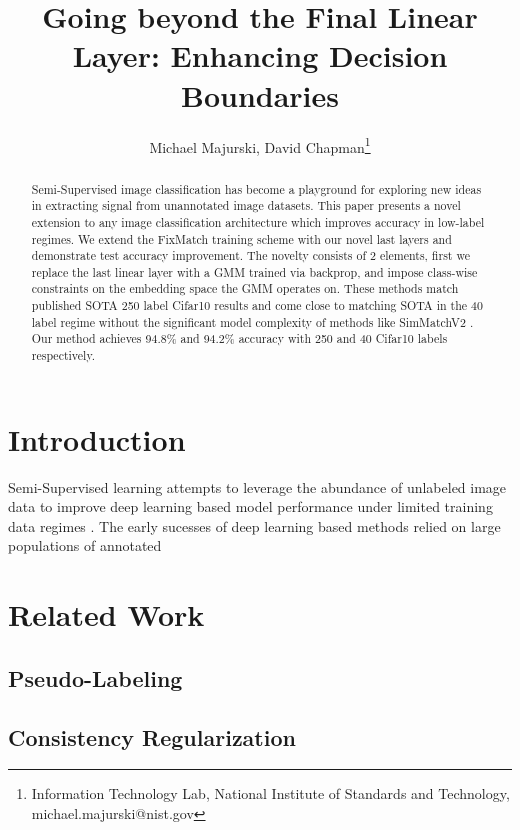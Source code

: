 \documentclass[10pt,twocolumn]{article}
\title{Going beyond the Final Linear Layer: Enhancing Decision Boundaries}
\author{Michael Majurski, David Chapman\thanks{Information Technology Lab, National Institute of Standards and Technology, michael.majurski@nist.gov}
}
\begin{document}
\maketitle

\begin{abstract}
Semi-Supervised image classification has become a playground for exploring new ideas in extracting signal from unannotated image datasets.
This paper presents a novel extension to any image classification architecture which improves accuracy in low-label regimes. 
We extend the FixMatch \cite{sohn2020fixmatch} training scheme with our novel last layers and demonstrate test accuracy improvement. 
The novelty consists of 2 elements, first we replace the last linear layer with a GMM trained via backprop, and impose class-wise constraints on the embedding space the GMM operates on.
These methods match published SOTA 250 label Cifar10 \cite{cifar10} results and come close to matching SOTA in the 40 label regime without the significant model complexity of methods like SimMatchV2 \cite{zheng2023simmatchv2}.
Our method achieves 94.8\% and 94.2\% accuracy with 250 and 40 Cifar10 labels respectively.
\end{abstract}


\section{Introduction}
Semi-Supervised learning attempts to leverage the abundance of unlabeled image data to improve deep learning based model performance under limited training data regimes \cite{zhu2022introduction,li2019safe,hady2013semi}.
The early sucesses of deep learning based methods relied on large populations of annotated 





\section{Related Work}



\subsection{Pseudo-Labeling}

\subsection{Consistency Regularization}
\end{document}
